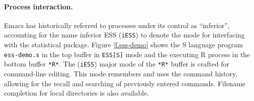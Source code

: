 \documentclass{article}
\newcommand{\stexttt}[1]{{\small\texttt{#1}}}
\begin{document}
\paragraph{Process interaction.}
Emacs has historically referred to processes under its control as
``inferior'', accounting for the name inferior ESS (\stexttt{iESS}) to
denote the mode for interfacing with the statistical package.  Figure
\ref{f.ess-demo} shows the S language program \stexttt{ess-demo.s} in
the top buffer in \stexttt{ESS[S]} mode and the executing R process in
the bottom buffer \stexttt{*R*}.  The
(\stexttt{iESS}) major mode of the \stexttt{*R*} buffer is crafted for
command-line editing.  This mode remembers and uses the command
history, allowing for the recall and searching of previously entered
commands.  Filename completion for local directories is also
available.
\end{document}
